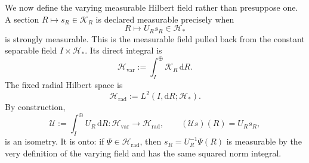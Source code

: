 We now define the varying measurable Hilbert field rather than presuppose
one.  A section \(R\mapsto s_R\in\mathscr K_R\) is declared measurable
precisely when
\[
 R\longmapsto U_Rs_R\in\mathscr H_*
\]
is strongly measurable.  This is the measurable field pulled back from the
constant separable field \(I\times\mathscr H_*\).  Its direct integral is
\[
 \mathscr H_{\mathrm{var}}
 :=\int_I^\oplus\mathscr K_R\,\mathrm d R.
\]
The fixed radial Hilbert space is
\[
 \mathscr H_{\mathrm{rad}}
 :=L^2(I,\mathrm d R;\mathscr H_*).
\]
By construction,
\begin{equation}
 \mathscr U:=\int_I^\oplus U_R\,\mathrm d R:
 \mathscr H_{\mathrm{var}}\longrightarrow\mathscr H_{\mathrm{rad}},
 \qquad
 (\mathscr Us)(R)=U_Rs_R,
\label{native-di-direct-integral-unitary}
\end{equation}
is an isometry.  It is onto: if
\(\Psi\in\mathscr H_{\mathrm{rad}}\), then
\(s_R=U_R^{-1}\Psi(R)\) is measurable by the very definition of the
varying field and has the same squared norm integral.

